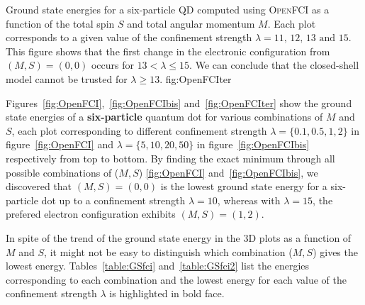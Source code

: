 {Ground state energies for a six-particle QD computed using \textsc{OpenFCI} as a function of the total spin $S$ and total angular momentum $M$. Each plot corresponds to a given value of the confinement strength $\lambda=11,\,12,\,13 \text{ and }15$. This figure shows that the first change in the electronic configuration from $(M,S)=(0,0)$ occurs for $13 < \lambda \leq 15$. We can conclude that the closed-shell model cannot be trusted for $\lambda \geq 13$.}
{fig:OpenFCIter}

Figures~\ref{fig:OpenFCI},~\ref{fig:OpenFCIbis} and~\ref{fig:OpenFCIter} show the ground state energies of a \textbf{six-particle} quantum dot for various combinations of $M$ and $S$, each plot corresponding to different confinement strength $\lambda=\{0.1,0.5,1,2\}$ in figure~\ref{fig:OpenFCI} and $\lambda=\{5,10,20,50\}$ in figure~\ref{fig:OpenFCIbis} respectively from top to bottom. By finding the exact minimum through all possible combinations of ($M,S$) \ref{fig:OpenFCI} and~\ref{fig:OpenFCIbis}, we discovered that $(M,S)=(0,0)$ is the lowest ground state energy for a six-particle dot up to a confinement strength $\lambda=10$, whereas with $\lambda=15$, the prefered electron configuration exhibits  $(M,S)=(1,2)$.


In spite of  the trend of the ground state energy in the 3D plots  as a function of $M$ and $S$, it might not be easy to distinguish which combination ($M,S$) gives the lowest energy. Tables~\ref{table:GSfci} and~\ref{table:GSfci2} list the energies corresponding to each combination and the lowest energy for each value of the confinement strength $\lambda$ is highlighted in bold face.



